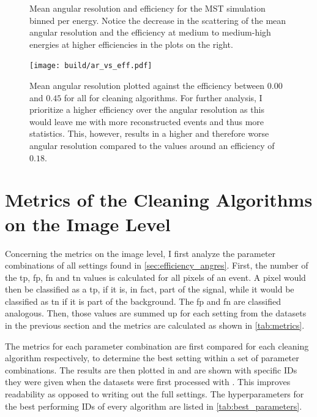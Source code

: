 \begin{figure}
\begin{subfigure}{0.48\textwidth}
    \end{subfigure}
    \caption{Mean angular resolution and efficiency for the MST simulation binned per energy. Notice
    the decrease in the scattering of the mean angular resolution and the efficiency at medium to
    medium-high energies at higher efficiencies in the plots on the right.\vspace{-0.5cm}}%
    \label{fig:efficiency_angres}
\end{figure}
\begin{figure}[!htbp]
    \centering
    \texttt{[image: build/ar\_vs\_eff.pdf]}
    \caption{Mean angular resolution plotted against the efficiency between \(\num{0.00}\) and \(\num{0.45}\) for
    all for cleaning algorithms. For further analysis, I prioritize a higher efficiency over the angular resolution
    as this would leave me with more reconstructed events and thus more statistics. This, however, results in
    a higher and therefore worse angular resolution compared to \eg the values around an efficiency of \(0.18\).}%
    \label{fig:ar_vs_eff}
\end{figure}


\section{Metrics of the Cleaning Algorithms on the Image Level}%
\label{sec:metrics}
Concerning the metrics on the image level, I first analyze the parameter combinations of all settings found in \autoref{sec:efficiency_angres}. First,
the number of the \gls{tp}, \gls{fp}, \gls{fn} and \gls{tn} values is calculated for all pixels of an event. A pixel would
then be classified as a \gls{tp}, if it is, in fact, part of the signal, while it would be classified as \gls{tn} if it is
part of the background. The \gls{fp} and \gls{fn} are classified analogous. Then, those values are
summed up for each setting from the datasets in the previous section and the metrics are calculated as shown in
\autoref{tab:metrics}.

The metrics for each parameter combination are first compared for each cleaning algorithm respectively,
to determine the best setting within a set of parameter combinations. The results are then plotted in
and are shown with specific IDs they were given when the datasets were first processed with \ctapipe.
This improves readability as opposed to writing out the full settings. The hyperparameters for the best performing
IDs of every algorithm are listed in \autoref{tab:best_parameters}.

